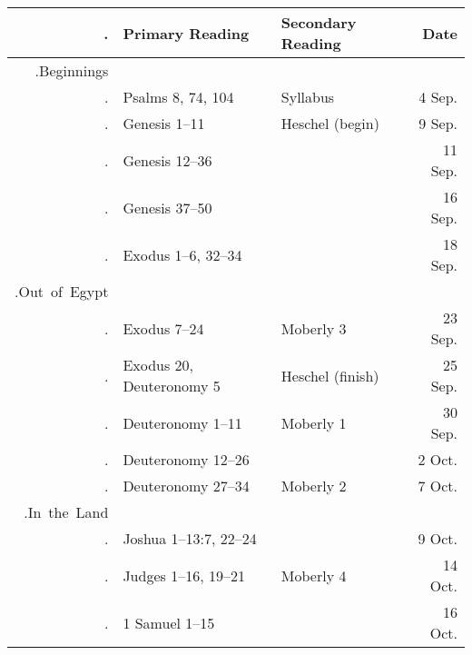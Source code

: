 \documentclass[titlepage]{article}
\begin{document}
\begin{table}[phtb]
  \centering
  \begin{tabular}{>{\sessioncount.}r@{ }llr}
    \toprule
    \sessionskip{\textbf{\S}.}&\textbf{Primary Reading}&\textbf{Secondary Reading}&\textbf{Date}\\
    \midrule

    \unit{Beginnings} \\

          & Psalms 8, 74, 104               & Syllabus         &  4 Sep.     \\
          
          & Genesis 1--11                   & Heschel (begin)  &  9 Sep.     \\
          & Genesis 12--36                  &                  & 11 Sep.     \\
          
          & Genesis 37--50                  &                  & 16 Sep.     \\
          & Exodus 1--6, 32--34             &                  & 18 Sep.     \\ [1ex]

    \unit{Out of Egypt} \\
          
          & Exodus 7--24                    & Moberly 3        & 23 Sep.     \\
          & Exodus 20, Deuteronomy 5        & Heschel (finish) & 25 Sep.     \\
          
          & Deuteronomy 1--11               & Moberly 1        & 30 Sep.     \\
          & Deuteronomy 12--26              &                  &  2 Oct.     \\
          
          & Deuteronomy 27--34              & Moberly 2        &  7 Oct.     \\ [1ex]

    \unit{In the Land} \\

          & Joshua 1--13:7, 22--24          &                  &  9 Oct.     \\
          
          & Judges 1--16, 19--21            & Moberly 4        & 14 Oct.     \\
          & 1 Samuel 1--15                  &                  & 16 Oct.     \\
          

\end{tabular}
\end{table}
\end{document}
